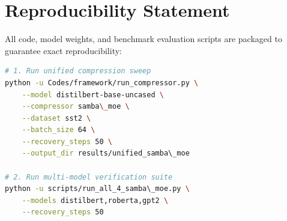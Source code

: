 \section{Reproducibility Statement}
All code, model weights, and benchmark evaluation scripts are packaged to guarantee exact reproducibility:
\begin{lstlisting}[language=bash]
# 1. Run unified compression sweep
python -u Codes/framework/run_compressor.py \
    --model distilbert-base-uncased \
    --compressor samba\_moe \
    --dataset sst2 \
    --batch_size 64 \
    --recovery_steps 50 \
    --output_dir results/unified_samba\_moe

# 2. Run multi-model verification suite
python -u scripts/run_all_4_samba\_moe.py \
    --models distilbert,roberta,gpt2 \
    --recovery_steps 50
\end{lstlisting}
